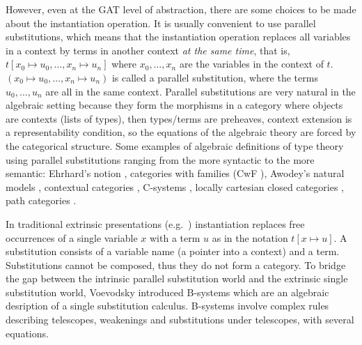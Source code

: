 \documentclass[a4paper,UKenglish,cleveref, autoref, thm-restate]{lipics-v2021}
\begin{document}

However, even at the GAT level of abstraction, there are some choices
to be made about the instantiation operation. It is usually convenient
to use parallel substitutions, which means that the instantiation
operation replaces all variables in a context by terms in another
context \emph{at the same time}, that is, $t[x_0\mapsto
  u_0,\dots,x_n\mapsto u_n]$ where $x_0,\dots,x_n$ are the variables
in the context of $t$. $(x_0\mapsto u_0,\dots,x_n\mapsto u_n)$ is
called a parallel substitution, where the terms $u_0,\dots,u_n$ are
all in the same context. Parallel substitutions are very natural in
the algebraic setting because they form the morphisms in a category
where objects are contexts (lists of types), then types/terms are
preheaves, context extension is a representability condition, so the
equations of the algebraic theory are forced by the categorical
structure. Some examples of algebraic definitions of type theory using
parallel substitutions ranging from the more syntactic to the more
semantic: Ehrhard's notion \cite{ehrhard,coquandEhrhard}, categories
with families (CwF \cite{DBLP:conf/types/Dybjer95,Castellan2021}),
Awodey's natural models \cite{DBLP:journals/mscs/Awodey18}, contextual
categories \cite{DBLP:journals/apal/Cartmell86}, C-systems
\cite{DBLP:journals/lmcs/AhrensLV18}, locally cartesian closed
categories \cite{DBLP:journals/mscs/ClairambaultD14}, path categories
\cite{10.1145/3204492}.

In traditional extrinsic presentations
(e.g.\ \cite{alti:phd93,DBLP:books/daglib/0005958}) instantiation
replaces free occurrences of a single variable $x$ with a term $u$ as
in the notation $t[x\mapsto u]$. A substitution consists of a
variable name (a pointer into a context) and a term. Substitutions
cannot be composed, thus they do not form a category. To bridge the
gap between the intrinsic parallel substitution world and the
extrinsic single substitution world, Voevodsky introduced B-systems
\cite{AHRENS_EMMENEGGER_NORTH_RIJKE_2023} which are an algebraic
desription of a single substitution calculus. B-systems involve
complex rules describing telescopes, weakenings and substitutions
under telescopes, with several equations.
\end{document}
